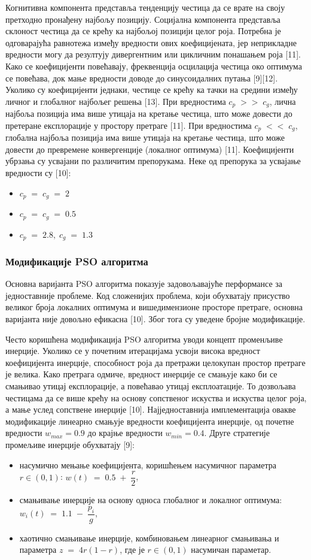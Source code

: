 \documentclass[12pt]{article}
\begin{document}
Когнитивна компонента представља тенденцију честица да се врате на своју претходно пронађену најбољу позицију. Социјална компонента представља склоност честица да се крећу ка најбољој позицији целог роја. 
Потребна је одговарајућа равнотежа између вредности ових коефицијената, јер неприкладне вредности могу да резултују дивергентним или цикличним понашањем роја [11]. Како се коефицијенти повећавају, фреквенција осцилација честица око оптимума се повећава, док мање вредности доводе до синусоидалних путања [9][12]. Уколико су коефицијенти једнаки, честице се крећу ка тачки на средини између личног и глобалног најбољег решења [13]. При вредностима $c_p\;>>\;c_g$, лична најбоља позиција има више утицаја на кретање честица, што може довести до претеране експлорације у простору претраге [11]. При вредностима $c_p\;<<\;c_g$, глобална најбоља позиција има више утицаја на кретање честица, што може довести до превремене конвергенције (локалног оптимума) [11]. Коефицијенти убрзања су усвајани по различитим препорукама. Неке од препорука за усвајање вредности су [10]: 
\begin{itemize}
    \item $c_p\;=\;c_g\;=\;2$
    \item $c_p\;=\;c_g\;=\;0.5$
    \item $c_p\;=\;2.8,\;c_g\;=\;1.3$
\end{itemize}
\subsubsection{Модификације PSO алгоритма}
Основна варијанта PSO алгоритма показује задовољавајуће перформансе за једноставније проблеме. Код сложенијих проблема, који обухватају присуство великог броја локалних оптимума и вишедимензионе просторе претраге, основна варијанта није довољно ефикасна [10]. Због тога су уведене бројне модификације.

Често коришћена модификација PSO алгоритма уводи концепт променљиве инерције. Уколико се у почетним итерацијама усвоји висока вредност коефицијента инерције, способност роја да претражи целокупан простор претраге је велика. Како претрага одмиче, вредност инерције се смањује како би се смањивао утицај експлорације, а повећавао утицај експлоатације. То дозвољава честицама да се више крећу на основу сопственог искуства и искуства целог роја, а мање услед сопствене инерције [10]. Најједноставнија имплементација овакве модификације линеарно смањује вредности коефицијента инерције, од почетне вредности $w_{max}=0.9$ до крајње вредности $w_{min}=0.4$. Друге стратегије промељиве инерције обухватају [9]:
\begin{itemize}
    \item насумично мењање коефицијента, коришћењем насумичног параметра $r\in(0,1)$: $w(t)\;=\;0.5\;+\;\dfrac{r}{2}$,
    \item смањивање инерције на основу односа глобалног и локалног оптимума: $w_i(t)\;=\;1.1\;-\;\dfrac{p_i}{g}$,
    \item хаотично смањивање инерције, комбиновањем линеарног смањивања и параметра $z\;=\;4r(1-r)$, где је $r\in(0,1)$ насумичан параметар.
\end{itemize}
\end{document}
